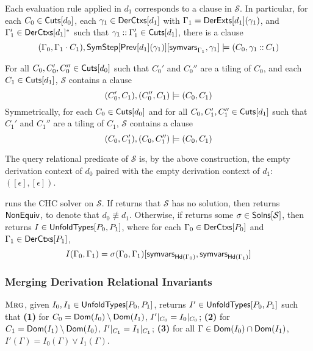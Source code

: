 Each evaluation rule applied in $d_1$ corresponds to a clause in
$\mathcal{S}$.
%
In particular, for each $C_0 \in \mathsf{Cuts}[  d_0  ]$, %
each $\gamma_1 \in \mathsf{DerCtxs}[  d_1  ]$ with $\Gamma_1 = \mathsf{DerExts}[ d_1 ](
\gamma_1 )$, and %
$\Gamma_1' \in \mathsf{DerCtxs}[  d_1  ]^{*}$ such that $\gamma_1 \mathbin{::}
\Gamma_1' \in \mathsf{Cuts}[  d_1  ]$, there is a clause
\[ ( \Gamma_0, \Gamma_1 \concat C_1), %
\symstep{ \prevrule{ d_1 }( \gamma_1 ) }[ %
\symvars{ \Gamma_1 }, \gamma_1 ] \entails %
(C_0, \gamma_1 \cons C_1) 
\]

For all $C_0, C_0', C_0'' \in \mathsf{Cuts}[ d_0 ]$ such that $C_0'$ and $C_0''$
are a tiling of $C_0$, and %
each $C_1 \in \mathsf{Cuts}[ d_1 ]$, $\mathcal{S}$ contains a clause
\[ (C_0', C_1), (C_0'', C_1) \models (C_0, C_1) \]
%
Symmetrically, for each $C_0 \in \mathsf{Cuts}[ d_0 ]$ and %
for all $C_0, C_1', C_1'' \in \mathsf{Cuts}[ d_1 ]$ such that $C_1'$ and $C_1''$
are a tiling of $C_1$, %
$\mathcal{S}$ contains a clause
\[ (C_0, C_1'), (C_0, C_1'') \models (C_0, C_1)
\]

The query relational predicate of $\mathcal{S}$ is, by the above
construction, the empty derivation context of $d_0$ paired with the
empty derivation context of $d_1$: $( [ \epsilon ], [ \epsilon ])$.

\verifyders runs the CHC solver \solvechc on $\mathcal{S}$.
%
If \solvechc returns that $\mathcal{S}$ has no solution, then
\verifyders returns $\mathsf{NonEquiv}$, to denote that $d_0 \not\equiv d_1$.
%
Otherwise, if \solvechc returns some $\sigma \in \mathsf{Solns}[ 
  \mathcal{S}  ]$, then \verifyders returns $I \in
\mathsf{UnfoldTypes}[ P_0, P_1 ]$, where for each $\Gamma_0 \in \mathsf{DerCtxs}[  P_0  ]$
and $\Gamma_1 \in \mathsf{DerCtxs}[  P_1  ]$,
\[ I(\Gamma_0, \Gamma_1) = %
\subs{ \sigma(\Gamma_0, \Gamma_1) }{ %
  \symvars{ \headexps( \Gamma_0 ) }, %
  \symvars{ \headexps( \Gamma_1 ) } } \]

\subsubsection{Merging Derivation Relational Invariants}
\label{sec:merge}
$\textsc{Mrg}$, given $I_0, I_1 \in \mathsf{UnfoldTypes}[ P_0, P_1 ]$, returns $I'
\in \mathsf{UnfoldTypes}[ P_0, P_1 ]$ such that
\textbf{(1)} for $C_0 = \mathsf{Dom}(I_0) \setminus \mathsf{Dom}(I_1)$,
$I'|_{C_0} = I_0|_{C_0}$; 
\textbf{(2)} for $C_1 = \mathsf{Dom}(I_1) \setminus \mathsf{Dom}(I_0)$,
$I'|_{C_1} = I_1|_{C_1}$;
\textbf{(3)} for all $\Gamma \in \mathsf{Dom}(I_0) \cap
\mathsf{Dom}(I_1)$, $I'(\Gamma) = I_0(\Gamma) \lor I_1(\Gamma)$.

